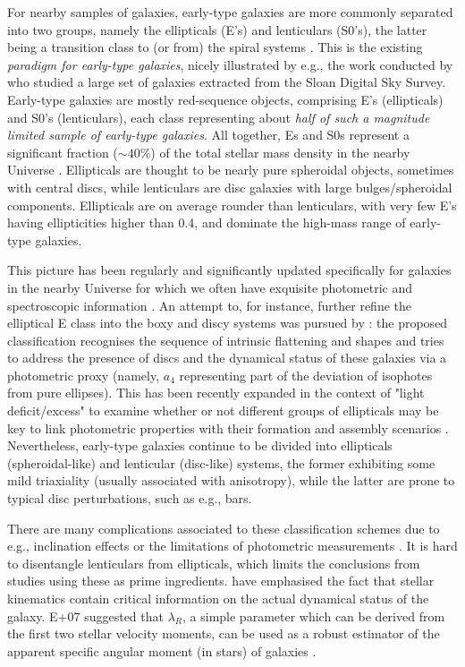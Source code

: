 \documentclass[useAMS,usenatbib,usegraphicx]{mn2e}
\begin{document}
For nearby samples of galaxies, early-type galaxies are more commonly separated into 
two groups, namely the ellipticals (E's) and lenticulars (S0's), 
the latter being a transition class to (or from) the spiral systems \citep{Hubble36}. 
This is the existing {\em paradigm for early-type galaxies}, nicely illustrated 
by e.g., the work conducted by \cite{Bernardi+10} who studied a large set of galaxies extracted
from the Sloan Digital Sky Survey. 
Early-type galaxies are mostly red-sequence objects, comprising
E's (ellipticals) and S0's (lenticulars), each class representing about {\em half of
such a magnitude limited sample of early-type galaxies}. All together, Es and S0s
represent a significant fraction ($\sim 40\%$) of the total stellar mass density in the
nearby Universe \citep{Bernardi+10,Fukugita+07}. 
Ellipticals are thought to be nearly pure spheroidal objects, 
sometimes with central discs, while lenticulars are disc galaxies 
with large bulges/spheroidal components. Ellipticals are on average rounder 
than lenticulars, with very few E's having ellipticities higher than 0.4, 
and dominate the high-mass range of early-type galaxies.

This picture has been regularly and significantly updated 
specifically for galaxies in the nearby Universe for which we often have exquisite
photometric and spectroscopic information \citep{Bender+94,Rix+99, Gerhard+99}. 
An attempt to, for instance, further refine the elliptical E 
class into the boxy and discy systems was pursued by \cite{KB96}:
the proposed classification recognises the sequence of
intrinsic flattening and shapes and tries to address the presence of discs 
\citep{RixWhite90,Scorza+98, NaabBurkert01} 
and the dynamical status of these galaxies via a photometric proxy 
(namely, $a_4$ representing part of the
deviation of isophotes from pure ellipses). This has been recently expanded in
the context of "light deficit/excess" \citep{Graham+03,Graham04, Ferrarese+06, Cote+06,
Kormendy+09} to examine whether or not different groups of ellipticals may 
be key to link photometric properties with
their formation and assembly scenarios \citep{Naab+99, Khochfar+05, Kormendy+09,Hopkins+09a, Hopkins+09c}.
Nevertheless, early-type galaxies continue to be divided into ellipticals (spheroidal-like) and
lenticular (disc-like) systems, the former exhibiting some mild triaxiality
(usually associated with anisotropy), while the latter are prone to 
typical disc perturbations, such as e.g., bars.

There are many complications associated to these classification schemes due to e.g., inclination
effects or the limitations of photometric measurements \citep{KB96,PaperX}.
It is hard to disentangle lenticulars from ellipticals, which limits
the conclusions from studies using these as prime ingredients.
\citet[][hereafter E+07]{PaperIX} have emphasised the fact that
stellar kinematics contain critical information on the actual dynamical status of
the galaxy. E+07 suggested that $\lambda_R$, a simple parameter which can be derived
from the first two stellar velocity moments, can be used as a robust estimator of the
apparent specific angular moment (in stars) of galaxies \citep[see also][]{Jesseit+09}. 
\end{document}
